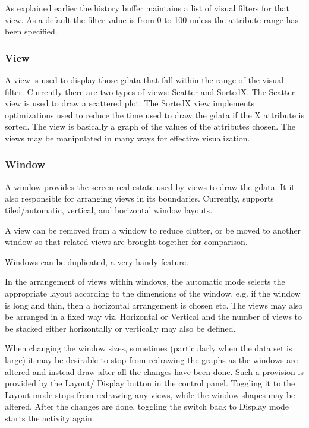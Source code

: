 As explained earlier the history buffer maintains a list of visual
filters for that view. As a default the filter value is from 0 to 100
unless the attribute range has been specified.

\subsubsection{View}

A view is used to display those gdata that fall within the range of
the visual filter. Currently there are two types of views: Scatter and
SortedX. The Scatter view is used to draw a scattered plot. The
SortedX view implements optimizations used to reduce the time used to
draw the gdata if the X attribute is sorted. The view is basically a
graph of the values of the attributes chosen. The views may be
manipulated in many ways for effective visualization.

\subsubsection{Window}

A window provides the screen real estate used by views to draw the
gdata. It it also responsible for arranging views in its
boundaries. Currently, \Devise supports tiled/automatic, vertical, and
horizontal window layouts.

A view can be removed from a window to reduce clutter, or be moved to
another window so that related views are brought together for
comparison.

Windows can be duplicated, a very handy feature.

In the arrangement of views within windows, the automatic mode selects
the appropriate layout according to the dimensions of the
window. e.g. if the window is long and thin, then a horizontal
arrangement is chosen etc. The views may also be arranged in a fixed
way viz. Horizontal or Vertical and the number of views to be stacked
either horizontally or vertically may also be defined.

When changing the window sizes, sometimes (particularly when the data
set is large) it may be desirable to stop \Devise from redrawing the
graphs as the windows are altered and instead draw after all the
changes have been done. Such a provision is provided by the Layout/
Display button in the control panel. Toggling it to the Layout mode
stops \Devise from redrawing any views, while the window shapes may be
altered. After the changes are done, toggling the switch back to
Display mode starts the activity again.

